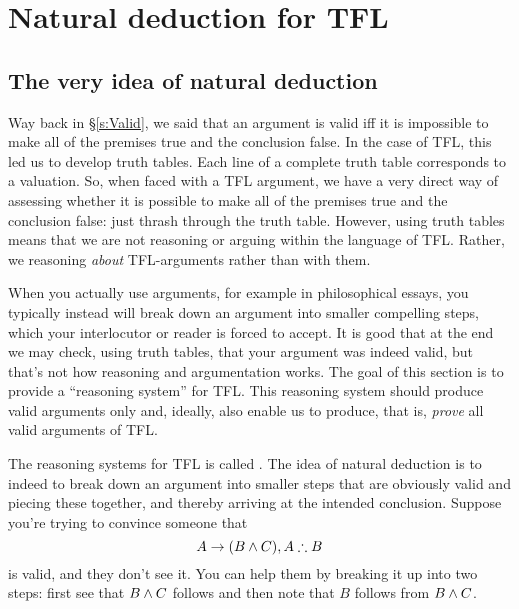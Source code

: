 \part{Natural deduction for TFL}
\label{ch.NDTFL}

\chapter{The very idea of natural deduction}\label{s:NDVeryIdea}

Way back in \S\ref{s:Valid}, we said that an argument is valid iff it is impossible to make all of the premises true and the conclusion false. In the case of TFL, this led us to develop truth tables. Each line of a complete truth table corresponds to a valuation. So, when faced with a TFL argument, we have a very direct way of assessing whether it is possible to make all of the premises true and the conclusion false: just thrash through the truth table. However, using truth tables means that we are not reasoning or arguing within the language of TFL. Rather, we reasoning \emph{about} TFL-arguments rather than with them.

When you actually use arguments, for example in philosophical essays, you typically instead will break down an argument into smaller compelling steps, which your interlocutor or reader is forced to accept. It is good that at the end we may check, using truth tables, that your argument was indeed valid, but that's not how reasoning and argumentation works. The goal of this section is to provide a ``reasoning system'' for TFL. This reasoning system should produce valid arguments only and, ideally, also enable us to produce, that is, \emph{prove} all valid arguments of TFL.

 The reasoning systems for TFL is called . The idea of natural deduction is to indeed to break down an argument into smaller steps that are obviously valid and piecing these together, and thereby arriving at the intended conclusion. Suppose you're trying to convince someone that $$A\eif(B\eand C),A\therefore B$$ is valid, and they don't see it. You can help them by breaking it up into two steps: first see that $B\mathbin{\wedge} C$ follows and then note that $B$ follows from $B\mathbin{\wedge} C$.


